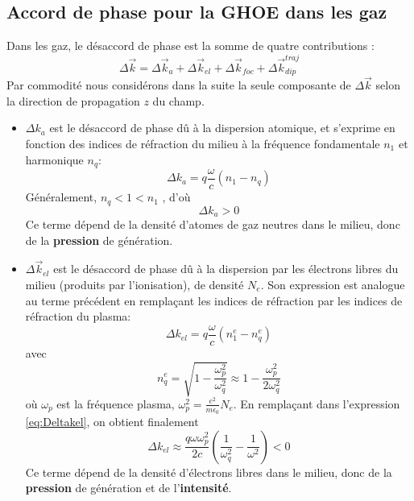 \subsection{Accord de phase pour la GHOE dans les gaz}
Dans les gaz, le désaccord de phase est la somme de quatre contributions :
\begin{equation}
\Delta \vec{k} = \Delta \vec{k}_a + \Delta \vec{k}_{el} + \Delta \vec{k}_{foc} + \Delta \vec{k}_{dip}^{traj}
\end{equation}
Par commodité nous considérons dans la suite la seule composante de $\Delta \vec{k}$ selon la direction de propagation $z$ du champ.
\begin{itemize}
\item $\Delta k_a$ est le désaccord de phase dû à la dispersion atomique, et s'exprime en fonction des indices de réfraction du milieu à la fréquence fondamentale $n_1$ et harmonique $n_q$: \begin{equation}
\Delta k_a = q \frac{\omega}{c}(n_1 - n_q) 
\end{equation}
Généralement, $n_q < 1 < n_1$ , d'où
\begin{equation}
\Delta k_a > 0
\end{equation}
Ce terme dépend de la densité d'atomes de gaz neutres dans le milieu, donc de la \textbf{pression} de génération.
\item $\Delta \vec{k}_{el}$ est le désaccord de phase dû à la dispersion par les électrons libres du milieu (produits par l'ionisation), de densité $N_e$. Son expression est analogue au terme précédent en remplaçant les indices de réfraction par les indices de réfraction du plasma: 
\begin{equation}
\Delta k_{el} = q \frac{\omega}{c}(n_1^e - n_q^e)
\label{eq:Deltakel}
\end{equation}
avec
\begin{equation}
n_q^e = \sqrt{1 - \frac{\omega_p^2}{\omega_q^2}} \approx 1 -  \frac{\omega_p^2}{2\omega_q^2}
\end{equation}
où $\omega_p$ est la fréquence plasma, $\omega_p^2 = \frac{e^2}{m \epsilon_0} N_e$. En remplaçant dans l'expression \ref{eq:Deltakel}, on obtient finalement
\begin{equation}
\Delta k_{el} \approx \frac{q \omega \omega_p^2}{2c}(\frac{1}{\omega_q^2} - \frac{1}{\omega^2}) < 0
\end{equation}
Ce terme dépend de la densité d'électrons libres dans le milieu, donc de la \textbf{pression} de génération et de l'\textbf{intensité}.

\end{itemize}
